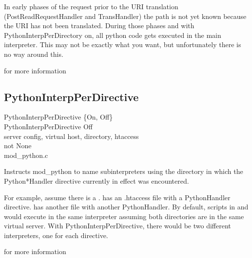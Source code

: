  In early phases of the request prior to the URI translation
(PostReadRequestHandler and TransHandler) the path is not yet known
because the URI has not been translated. During those phases and with
PythonInterpPerDirectory on, all python code gets executed in the
main interpreter. This may not be exactly what you want, but
unfortunately there is no way around this.

\begin{seealso}
	{for more information}
\end{seealso}

\subsection{PythonInterpPerDirective\label{dir-other-ipdv}}

PythonInterpPerDirective \{On, Off\} \\
PythonInterpPerDirective Off\\
server config, virtual host, directory, htaccess\\
not None\\
mod_python.c

Instructs mod_python to name subinterpreters using the directory in
which the Python*Handler directive currently in effect was
encountered.

For example, assume there is a
.  has an .htaccess
file with a PythonHandler directive.  
has another  file with another PythonHandler. By
default, scripts in  and
 would execute in the same interpreter
assuming both directories are in the same virtual server. With
PythonInterpPerDirective, there would be two different interpreters,
one for each directive.

\begin{seealso}
	{for more information}
\end{seealso}

